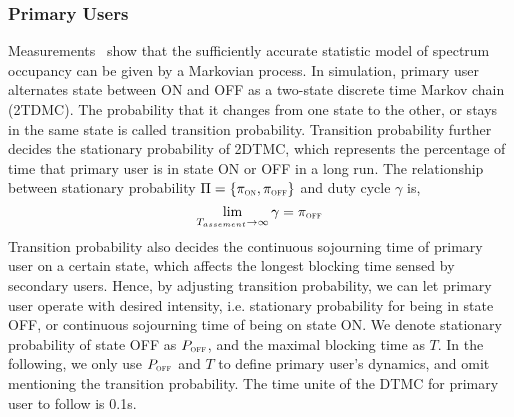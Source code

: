 \subsubsection*{Primary Users}
Measurements~\cite{ProbabilityAndComputing, dsa_model_markov_2006} show that the sufficiently accurate statistic model of spectrum occupancy can be given by a Markovian process.
In simulation, primary user alternates state between ON and OFF as a two-state discrete time Markov chain (\gls{2TDMC}).
The probability that it changes from one state to the other, or stays in the same state is called transition probability.
Transition probability further decides the stationary probability of 2DTMC, which represents the percentage of time that primary user is in state ON or OFF in a long run.
The relationship between stationary probability $\Pi=\{\pi_{\textsc{\tiny ON}}, \pi_{\textsc{\tiny OFF}}\}$ and duty cycle $\gamma$ is, 
\begin{equation}
\label{stationary_probability}
\lim\limits_{T_{assement} \to \infty }{\gamma} = \pi_{\textsc{\tiny OFF}}
\end{equation}
Transition probability also decides the continuous sojourning time of primary user on a certain state, which affects the longest blocking time sensed by secondary users.
Hence, by adjusting transition probability, we can let primary user operate with desired intensity, i.e. stationary probability for being in state OFF, or continuous sojourning time of being on state ON.
We denote stationary probability of state OFF as $P_{\textsc{\tiny OFF}}$, and the maximal blocking time as $T$.
In the following, we only use $P_{\textsc{\tiny OFF}}$ and $T$ to define primary user's dynamics, and omit mentioning the transition probability.
The time unite of the DTMC for primary user to follow is 0.1s.

